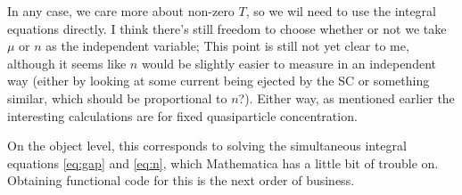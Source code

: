 \documentclass{article}
\newcommand{\corr}{\mu}
\begin{document}
In any case, we care more about non-zero $T$, so we wil need to use the integral equations directly.
I think there's still freedom to choose whether or not we take $\corr$ or $n$ as the independent variable;
This point is still not yet clear to me, although it seems like $n$ would be slightly easier to measure in an independent way (either by looking at some current being ejected by the SC or something similar, which should be proportional to $n$?).
Either way, as mentioned earlier the interesting calculations are for fixed quasiparticle concentration.

On the object level, this corresponds to solving the simultaneous integral equations \cref{eq:gap} and \cref{eq:n}, which Mathematica has a little bit of trouble on.
Obtaining functional code for this is the next order of business.

\printbibliography
\end{document}
